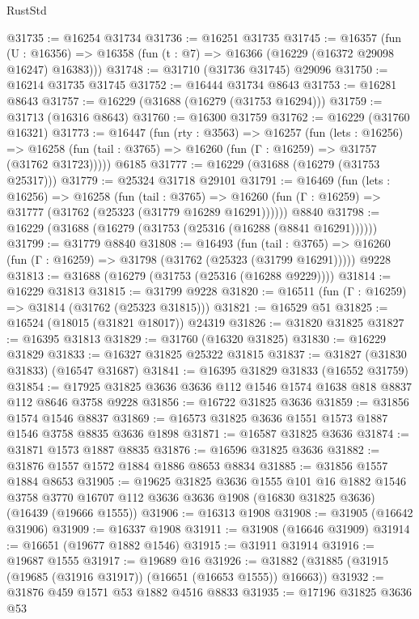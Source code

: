\begin{lexlean}{RustStd}
\begin{coremodule}
@31735 := @16254 @31734
@31736 := @16251 @31735
@31745 := @16357
    (fun (U : @16356) => @16358 (fun (t : @7) => @16366 (@16229 (@16372 @29098 @16247) @16383)))
@31748 := @31710 (@31736 @31745) @29096
@31750 := @16214 @31735 @31745
@31752 := @16444 @31734 @8643
@31753 := @16281 @8643
@31757 := @16229 (@31688 (@16279 (@31753 @16294)))
@31759 := @31713 (@16316 @8643)
@31760 := @16300 @31759
@31762 := @16229 (@31760 @16321)
@31773 := @16447
    (fun (rty : @3563) =>
    @16257
      (fun (lets : @16256) =>
      @16258 (fun (tail : @3765) => @16260 (fun (Γ : @16259) => @31757 (@31762 @31723)))))
    @6185
@31777 := @16229 (@31688 (@16279 (@31753 @25317)))
@31779 := @25324 @31718 @29101
@31791 := @16469
    (fun (lets : @16256) =>
    @16258
      (fun (tail : @3765) =>
      @16260 (fun (Γ : @16259) => @31777 (@31762 (@25323 (@31779 @16289 @16291))))))
    @8840
@31798 := @16229 (@31688 (@16279 (@31753 (@25316 (@16288 (@8841 @16291))))))
@31799 := @31779 @8840
@31808 := @16493
    (fun (tail : @3765) => @16260 (fun (Γ : @16259) => @31798 (@31762 (@25323 (@31799 @16291)))))
    @9228
@31813 := @31688 (@16279 (@31753 (@25316 (@16288 @9229))))
@31814 := @16229 @31813
@31815 := @31799 @9228
@31820 := @16511 (fun (Γ : @16259) => @31814 (@31762 (@25323 @31815)))
@31821 := @16529 @51
@31825 := @16524 (@18015 (@31821 @18017)) @24319
@31826 := @31820 @31825
@31827 := @16395 @31813
@31829 := @31760 (@16320 @31825)
@31830 := @16229 @31829
@31833 := @16327 @31825 @25322 @31815
@31837 := @31827 (@31830 @31833) (@16547 @31687)
@31841 := @16395 @31829 @31833 (@16552 @31759)
@31854 := @17925 @31825 @3636 @3636 @112 @1546 @1574 @1638 @818 @8837 @112 @8646 @3758 @9228
@31856 := @16722 @31825 @3636
@31859 := @31856 @1574 @1546 @8837
@31869 := @16573 @31825 @3636 @1551 @1573 @1887 @1546 @3758 @8835 @3636 @1898
@31871 := @16587 @31825 @3636
@31874 := @31871 @1573 @1887 @8835
@31876 := @16596 @31825 @3636
@31882 := @31876 @1557 @1572 @1884 @1886 @8653 @8834
@31885 := @31856 @1557 @1884 @8653
@31905 := @19625
    @31825
    @3636
    @1555
    @101
    @16
    @1882
    @1546
    @3758
    @3770
    @16707
    @112
    @3636
    @3636
    @1908
    (@16830 @31825 @3636)
    (@16439 (@19666 @1555))
@31906 := @16313 @1908
@31908 := @31905 (@16642 @31906)
@31909 := @16337 @1908
@31911 := @31908 (@16646 @31909)
@31914 := @16651 (@19677 @1882 @1546)
@31915 := @31911 @31914
@31916 := @19687 @1555
@31917 := @19689 @16
@31926 := @31882 (@31885 (@31915 (@19685 (@31916 @31917)) (@16651 (@16653 @1555)) @16663))
@31932 := @31876 @459 @1571 @53 @1882 @4516 @8833
@31935 := @17196 @31825 @3636 @53

\end{coremodule}
\end{lexlean}
